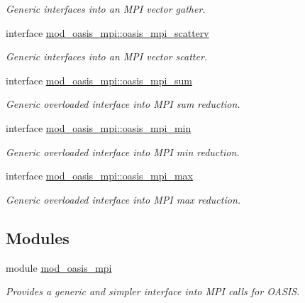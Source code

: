 \begin{DoxyCompactItemize}
\begin{DoxyCompactList}\small\item\em Generic interfaces into an M\+PI vector gather. \end{DoxyCompactList}\item 
interface \hyperlink{interfacemod__oasis__mpi_1_1oasis__mpi__scatterv}{mod\+\_\+oasis\+\_\+mpi\+::oasis\+\_\+mpi\+\_\+scatterv}
\begin{DoxyCompactList}\small\item\em Generic interfaces into an M\+PI vector scatter. \end{DoxyCompactList}\item 
interface \hyperlink{interfacemod__oasis__mpi_1_1oasis__mpi__sum}{mod\+\_\+oasis\+\_\+mpi\+::oasis\+\_\+mpi\+\_\+sum}
\begin{DoxyCompactList}\small\item\em Generic overloaded interface into M\+PI sum reduction. \end{DoxyCompactList}\item 
interface \hyperlink{interfacemod__oasis__mpi_1_1oasis__mpi__min}{mod\+\_\+oasis\+\_\+mpi\+::oasis\+\_\+mpi\+\_\+min}
\begin{DoxyCompactList}\small\item\em Generic overloaded interface into M\+PI min reduction. \end{DoxyCompactList}\item 
interface \hyperlink{interfacemod__oasis__mpi_1_1oasis__mpi__max}{mod\+\_\+oasis\+\_\+mpi\+::oasis\+\_\+mpi\+\_\+max}
\begin{DoxyCompactList}\small\item\em Generic overloaded interface into M\+PI max reduction. \end{DoxyCompactList}\end{DoxyCompactItemize}
\subsection*{Modules}
\begin{DoxyCompactItemize}
\item 
module \hyperlink{namespacemod__oasis__mpi}{mod\+\_\+oasis\+\_\+mpi}
\begin{DoxyCompactList}\small\item\em Provides a generic and simpler interface into M\+PI calls for O\+A\+S\+IS. \end{DoxyCompactList}\end{DoxyCompactItemize}
